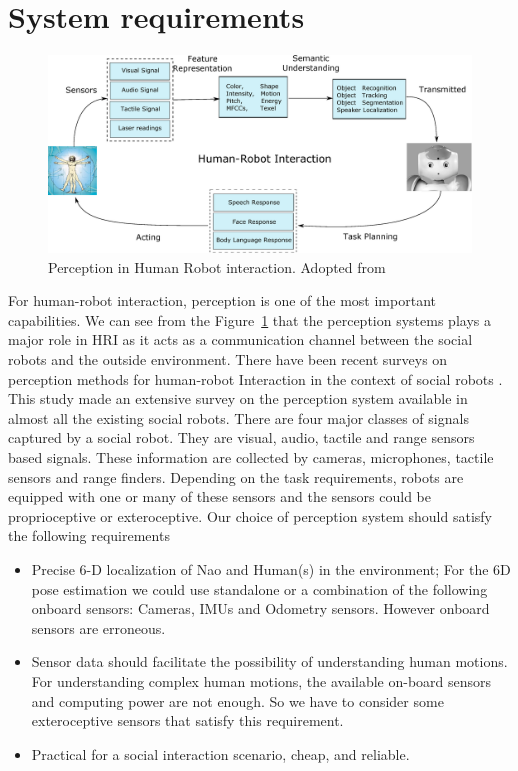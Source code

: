 \section{System requirements}
\begin{figure}[H]
\centering
\includegraphics[width=1\textwidth]{assets/hri_perception.eps}
\caption[Perception in Human Robot interaction]{Perception in Human Robot interaction. {Adopted from \cite{yan2014survey}}}
\label{fig:hri_perception}
\end{figure}
For human-robot interaction, perception is one of the most important capabilities. We can see from the Figure~\ref{fig:hri_perception} that the perception systems plays a major role in HRI as it acts as a communication channel between the social robots and the outside environment. There have been recent surveys on perception methods for human-robot Interaction in the context of social robots \cite{yan2014survey}. This study made an extensive survey on the perception system available in almost all the existing social robots. 
There are four major classes of signals captured by a social robot. They are visual, audio, tactile and range sensors based signals. These information are collected by cameras, microphones, tactile sensors and range finders\cite{yan2014survey}. Depending on the task requirements, robots are equipped with one or many of these sensors and the sensors could be proprioceptive or exteroceptive. 
Our choice of perception system should satisfy the following requirements
\begin{itemize}
\item Precise 6-D localization of Nao and Human(s) in the environment; For the 6D pose estimation we could use standalone or a combination of the following onboard sensors: Cameras, IMUs and Odometry sensors. However onboard sensors are erroneous.
\item Sensor data should facilitate the possibility of understanding human motions. For understanding complex human motions, the available on-board sensors and computing power are not enough. So we have to consider some exteroceptive sensors that satisfy this requirement. 
\item Practical for a social interaction scenario, cheap, and reliable.
\end{itemize}


